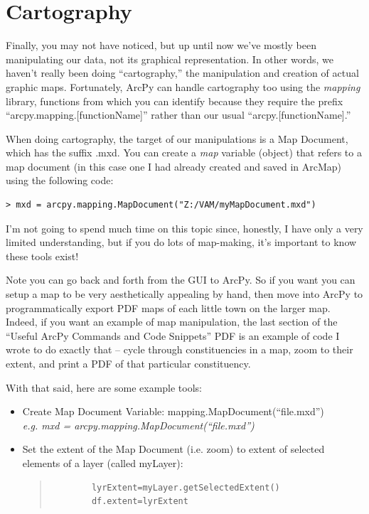 \documentclass[12pt]{article}
\begin{document}
\section{Cartography}\label{cartography}
Finally, you may not have noticed, but up until now we've mostly been manipulating our data, not its graphical representation. In other words, we haven't really been doing ``cartography,'' the manipulation and creation of actual graphic maps. Fortunately, ArcPy can handle cartography too using the \emph{mapping} library, functions from which you can identify because they require the prefix ``arcpy.mapping.[functionName]'' rather than our usual ``arcpy.[functionName].'' 

When doing cartography, the target of our manipulations is a Map Document, which has the suffix .mxd. You can create a \emph{map} variable (object) that refers to a map document (in this case one I had already created and saved in ArcMap) using the following code: 
\begin{verbatim}
> mxd = arcpy.mapping.MapDocument("Z:/VAM/myMapDocument.mxd")
\end{verbatim}

I'm not going to spend much time on this topic since, honestly, I have only a very limited understanding, but if you do lots of map-making, it's important to know these tools exist! 

Note you can go back and forth from the GUI to ArcPy. So if you want you can setup a map to be very aesthetically appealing by hand, then move into ArcPy to programmatically export PDF maps of each little town on the larger map.  Indeed, if you want an example of map manipulation, the last section of the ``Useful ArcPy Commands and Code Snippets'' PDF is an example of code I wrote to do exactly that -- cycle through constituencies in a map, zoom to their extent, and print a PDF of that particular constituency. 

With that said, here are some example tools:
\begin{itemize}
	\item Create Map Document Variable: mapping.MapDocument(``file.mxd'') \\
	\emph{e.g. mxd = arcpy.mapping.MapDocument(``file.mxd'')}
	\item Set the extent of the Map Document (i.e. zoom) to extent of selected elements of a layer (called myLayer): 
	\begin{quote}
	\begin{verbatim}
		lyrExtent=myLayer.getSelectedExtent()
		df.extent=lyrExtent
	\end{verbatim}		
	\end{quote}
\end{itemize} 
\end{document}
